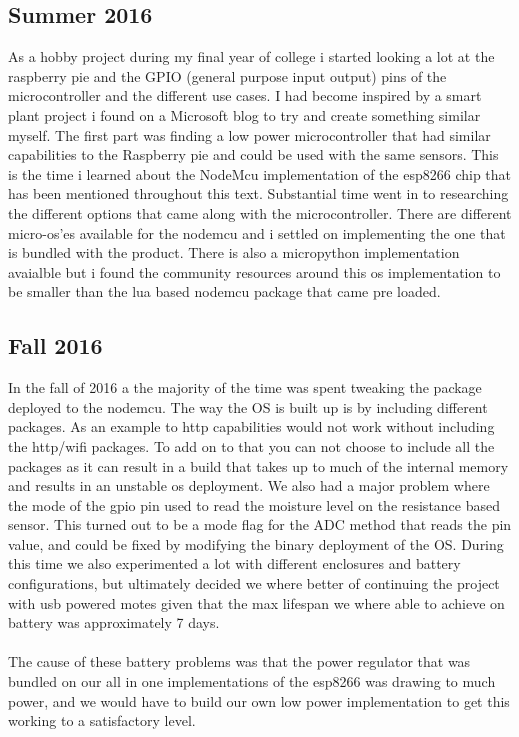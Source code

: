 \documentclass[]{uiophd}
\begin{document}
\subsection{Summer 2016}
As a hobby project during my final year of college i started looking a lot at the raspberry pie and the GPIO (general purpose input output) pins of the microcontroller and the different use cases. I had become inspired by a smart plant project i found on a Microsoft blog to try and create something similar myself. The first part was finding a low power microcontroller that had similar capabilities to the Raspberry pie and could be used with the same sensors. This is the time i learned about the NodeMcu implementation of the esp8266 chip that has been mentioned throughout this text. Substantial time went in to researching the different options that came along with the microcontroller. There are different micro-os'es available for the nodemcu and i settled on implementing the one that is bundled with the product. There is also a micropython implementation avaialble but i found the community resources around this os implementation to be smaller than the lua based nodemcu package that came pre loaded.
\subsection{Fall 2016}
In the fall of 2016 a the majority of the time was spent tweaking the package deployed to the nodemcu. The way the OS is built up is by including different packages. As an example to http capabilities would not work without including the http/wifi packages. To add on to that you can not choose to include all the packages as it can result in a build that takes up to much of the internal memory and results in an unstable os deployment. We also had a major problem where the mode of the gpio pin used to read the moisture level on the resistance based sensor. This turned out to be a mode flag for the ADC method that reads the pin value, and could be fixed by modifying the binary deployment of the OS. During this time we also experimented a lot with different enclosures and battery configurations, but ultimately decided we where better of continuing the project with usb powered motes given that the max lifespan we where able to achieve on battery was approximately 7 days.
\\\\
The cause of these battery problems was that the power regulator that was bundled on our all in one implementations of the esp8266 was drawing to much power, and we would have to build our own low power implementation to get this working to a satisfactory level.
\end{document}
